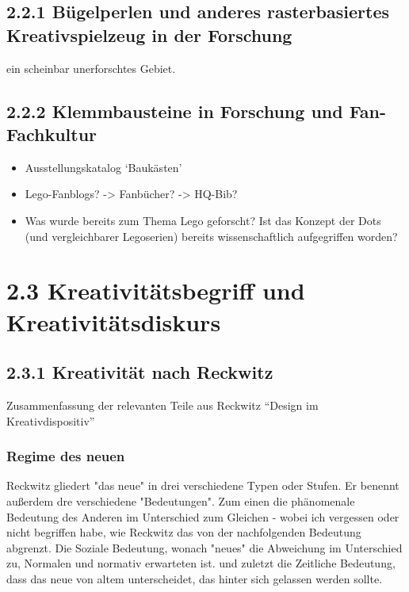 \documentclass[11pt,a4paper,twoside]{scrreprt}
\begin{document}
		\subsection{ 2.2.1 Bügelperlen und anderes rasterbasiertes Kreativspielzeug in der Forschung}
		ein scheinbar unerforschtes Gebiet.
		\subsection{2.2.2 Klemmbausteine in Forschung und Fan-Fachkultur}
		\begin{itemize}
			\item Ausstellungskatalog ‘Baukästen’
			\item Lego-Fanblogs? -> Fanbücher? -> HQ-Bib?
			\item Was wurde bereits zum Thema Lego geforscht? Ist das Konzept der Dots (und vergleichbarer Legoserien) bereits wissenschaftlich aufgegriffen worden?
		\end{itemize}


	\section{2.3 Kreativitätsbegriff und Kreativitätsdiskurs}
		\subsection{2.3.1 Kreativität nach Reckwitz}
			Zusammenfassung der relevanten Teile aus Reckwitz “Design im Kreativdispositiv”

			\subsubsection{Regime des neuen}

Reckwitz gliedert "das neue" in drei verschiedene Typen oder Stufen. Er benennt außerdem dre verschiedene "Bedeutungen". 
Zum einen die phänomenale Bedeutung des Anderen im Unterschied zum Gleichen - wobei ich vergessen oder nicht begriffen habe, wie Reckwitz das von der nachfolgenden Bedeutung abgrenzt.
Die Soziale Bedeutung, wonach "neues" die Abweichung im Unterschied zu, Normalen und normativ erwarteten ist.
und zuletzt die Zeitliche Bedeutung, dass das neue von altem unterscheidet, das hinter sich gelassen werden sollte.
\end{document}
